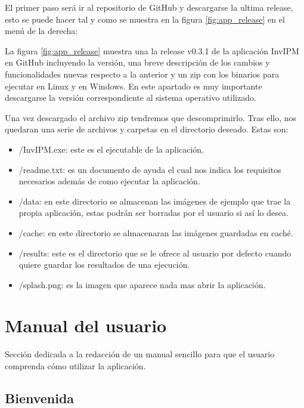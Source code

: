 El primer paso será ir al repositorio de GitHub y descargarse la ultima release, esto se puede hacer tal y como se muestra en la figura \ref{fig:app_release} en el menú de la derecha:


La figura \ref{fig:app_release} muestra una la release v0.3.1 de la aplicación InvIPM en GitHub incluyendo la versión, una breve descripción de los cambios y funcionalidades nuevas respecto a la anterior y un zip con los binarios para ejecutar en Linux y en Windows. En este apartado es muy importante descargarse la versión correspondiente al sistema operativo utilizado.

Una vez descargado el archivo zip tendremos que descomprimirlo. Tras ello, nos quedaran una serie de archivos y carpetas en el directorio deseado. Estas son:
    \begin{itemize}
        \item /InvIPM.exe: este es el ejecutable de la aplicación.
        \item /readme.txt: es un documento de ayuda el cual nos indica los requisitos necesarios además de como ejecutar la aplicación.
        \item /data: en este directorio se almacenan las imágenes de ejemplo que trae la propia aplicación, estas podrán ser borradas por el usuario si así lo desea.
        \item /cache: en este directorio se almacenaran las imágenes guardadas en caché.
        \item /results: este es el directorio que se le ofrece al usuario por defecto cuando quiere guardar los resultados de una ejecución.
        \item /splash.png: es la imagen que aparece nada mas abrir la aplicación.
    \end{itemize}
    
\section{Manual del usuario}\label{manual-del-usuario}

Sección dedicada a la redacción de un manual sencillo para que el usuario comprenda cómo utilizar la aplicación.

\subsection{Bienvenida}\label{bienvenida}

